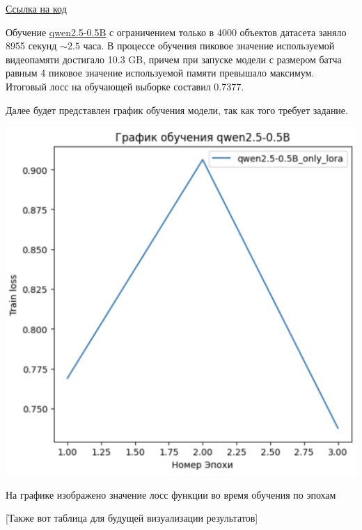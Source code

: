 \documentclass[12pt, twoside]{article}
\begin{document}
\href{https://github.com/MuQlanyu/2025-Project-178/blob/main/notebooks/reports/report_20.03.ipynb}{Ссылка на код}

Обучение \href{https://huggingface.co/Qwen/Qwen2.5-0.5B}{qwen2.5-0.5B} с ограничением только в 4000 объектов датасета заняло 8955 секунд $\sim 2.5$ часа. В процессе обучения пиковое значение используемой видеопамяти достигало 10.3 GB, причем при запуске модели с размером батча равным 4 пиковое значение используемой памяти превышало максимум. Итоговый лосс на обучающей выборке составил 0.7377.

Далее будет представлен график обучения модели, так как того требует задание.

\includegraphics[scale=0.5]{images/qwen_training.pdf}

На графике изображено значение лосс функции во время обучения по эпохам

[Также вот таблица для будущей визуализации результатов]
\end{document}
